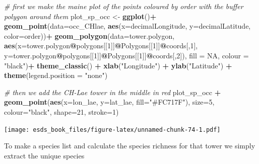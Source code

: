 \documentclass[
]{book}
\newenvironment{Shaded}{\begin{snugshade}}{\end{snugshade}}
\newcommand{\CommentTok}[1]{\textcolor[rgb]{0.56,0.35,0.01}{\textit{#1}}}
\newcommand{\DataTypeTok}[1]{\textcolor[rgb]{0.13,0.29,0.53}{#1}}
\newcommand{\DecValTok}[1]{\textcolor[rgb]{0.00,0.00,0.81}{#1}}
\newcommand{\KeywordTok}[1]{\textcolor[rgb]{0.13,0.29,0.53}{\textbf{#1}}}
\newcommand{\NormalTok}[1]{#1}
\newcommand{\OperatorTok}[1]{\textcolor[rgb]{0.81,0.36,0.00}{\textbf{#1}}}
\newcommand{\OtherTok}[1]{\textcolor[rgb]{0.56,0.35,0.01}{#1}}
\newcommand{\StringTok}[1]{\textcolor[rgb]{0.31,0.60,0.02}{#1}}
\begin{document}
\begin{Shaded}
\begin{Highlighting}[]
\CommentTok{# first we make the maine plot of the points coloured by order with the buffer polygon around them}
\NormalTok{plot_sp_occ <-}\StringTok{ }\KeywordTok{ggplot}\NormalTok{()}\OperatorTok{+}
\StringTok{  }\KeywordTok{geom_point}\NormalTok{(}\DataTypeTok{data=}\NormalTok{occ_CHlae, }\KeywordTok{aes}\NormalTok{(}\DataTypeTok{x=}\NormalTok{decimalLongitude, }\DataTypeTok{y=}\NormalTok{decimalLatitude, }\DataTypeTok{color=}\NormalTok{order))}\OperatorTok{+}
\StringTok{  }\KeywordTok{geom_polygon}\NormalTok{(}\DataTypeTok{data=}\NormalTok{tower.polygon, }
               \KeywordTok{aes}\NormalTok{(}\DataTypeTok{x=}\NormalTok{tower.polygon}\OperatorTok{@}\NormalTok{polygons[[}\DecValTok{1}\NormalTok{]]}\OperatorTok{@}\NormalTok{Polygons[[}\DecValTok{1}\NormalTok{]]}\OperatorTok{@}\NormalTok{coords[,}\DecValTok{1}\NormalTok{], }\DataTypeTok{y=}\NormalTok{tower.polygon}\OperatorTok{@}\NormalTok{polygons[[}\DecValTok{1}\NormalTok{]]}\OperatorTok{@}\NormalTok{Polygons[[}\DecValTok{1}\NormalTok{]]}\OperatorTok{@}\NormalTok{coords[,}\DecValTok{2}\NormalTok{]), }\DataTypeTok{fill =} \OtherTok{NA}\NormalTok{, }\DataTypeTok{colour =} \StringTok{"black"}\NormalTok{)}\OperatorTok{+}
\StringTok{  }\KeywordTok{theme_classic}\NormalTok{() }\OperatorTok{+}\StringTok{ }
\StringTok{  }\KeywordTok{xlab}\NormalTok{(}\StringTok{"Longitude"}\NormalTok{) }\OperatorTok{+}\StringTok{ }
\StringTok{  }\KeywordTok{ylab}\NormalTok{(}\StringTok{"Latitude"}\NormalTok{) }\OperatorTok{+}
\StringTok{  }\KeywordTok{theme}\NormalTok{(}\DataTypeTok{legend.position =} \StringTok{"none"}\NormalTok{)}

\CommentTok{# then we add the CH-Lae tower in the middle in red}
\NormalTok{plot_sp_occ }\OperatorTok{+}\StringTok{ }\KeywordTok{geom_point}\NormalTok{(}\KeywordTok{aes}\NormalTok{(}\DataTypeTok{x=}\NormalTok{lon_lae, }\DataTypeTok{y=}\NormalTok{lat_lae, }\DataTypeTok{fill=}\StringTok{"#FC717F"}\NormalTok{), }\DataTypeTok{size=}\DecValTok{5}\NormalTok{, }\DataTypeTok{colour=}\StringTok{"black"}\NormalTok{, }\DataTypeTok{shape=}\DecValTok{21}\NormalTok{, }\DataTypeTok{stroke=}\DecValTok{1}\NormalTok{)}
\end{Highlighting}
\end{Shaded}

\texttt{[image: esds\_book\_files/figure-latex/unnamed-chunk-74-1.pdf]}

To make a species list and calculate the species richness for that tower we simply extract the unique species
\end{document}
